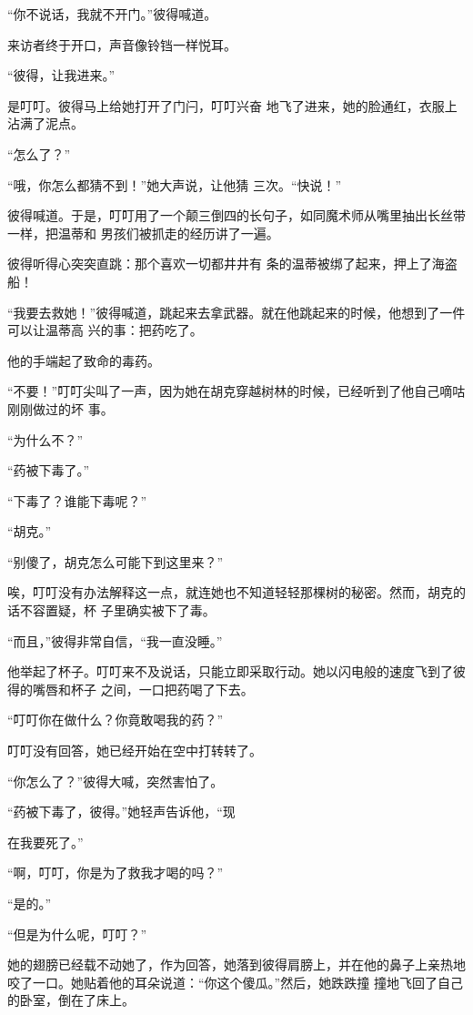 \documentclass{article}
\begin{document}
“你不说话，我就不开门。”彼得喊道。 


来访者终于开口，声音像铃铛一样悦耳。 


“彼得，让我进来。” 

是叮叮。彼得马上给她打开了门闩，叮叮兴奋
地飞了进来，她的脸通红，衣服上沾满了泥点。 


“怎么了？” 

“哦，你怎么都猜不到！”她大声说，让他猜
三次。“快说！” 

彼得喊道。于是，叮叮用了一个颠三倒四的长句子，如同魔术师从嘴里抽出长丝带一样，把温蒂和
男孩们被抓走的经历讲了一遍。 

\newpage

彼得听得心突突直跳：那个喜欢一切都井井有
条的温蒂被绑了起来，押上了海盗船！ 

“我要去救她！”彼得喊道，跳起来去拿武器。就在他跳起来的时候，他想到了一件可以让温蒂高
兴的事：把药吃了。 


他的手端起了致命的毒药。 

“不要！”叮叮尖叫了一声，因为她在胡克穿越树林的时候，已经听到了他自己嘀咕刚刚做过的坏
事。 


“为什么不？” 


“药被下毒了。” 


“下毒了？谁能下毒呢？” 


“胡克。” 

\newpage


“别傻了，胡克怎么可能下到这里来？” 

唉，叮叮没有办法解释这一点，就连她也不知道轻轻那棵树的秘密。然而，胡克的话不容置疑，杯
子里确实被下了毒。 

“而且，”彼得非常自信，“我一直没睡。”
 

他举起了杯子。叮叮来不及说话，只能立即采取行动。她以闪电般的速度飞到了彼得的嘴唇和杯子
之间，一口把药喝了下去。 


“叮叮你在做什么？你竟敢喝我的药？” 

叮叮没有回答，她已经开始在空中打转转了。


“你怎么了？”彼得大喊，突然害怕了。 

“药被下毒了，彼得。”她轻声告诉他，“现

\newpage
在我要死了。” 


“啊，叮叮，你是为了救我才喝的吗？” 


“是的。” 


“但是为什么呢，叮叮？” 

她的翅膀已经载不动她了，作为回答，她落到彼得肩膀上，并在他的鼻子上亲热地咬了一口。她贴着他的耳朵说道：“你这个傻瓜。”然后，她跌跌撞
撞地飞回了自己的卧室，倒在了床上。 
\end{document}
